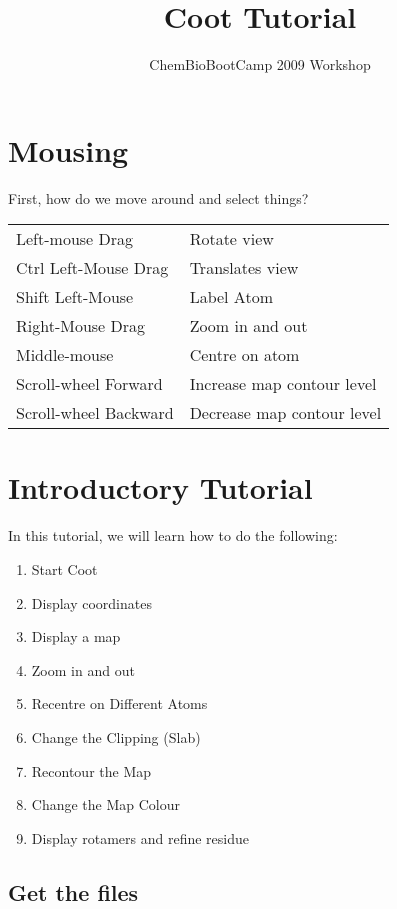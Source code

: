 \documentclass{article}
\title{Coot Tutorial}
\author{ChemBioBootCamp 2009 Workshop}
\begin{document}
\maketitle
\tableofcontents


\newpage

\section{Mousing}

First, how do we move around and select things?

\vspace{0.5cm}
  \begin{tabular}{ll}
    Left-mouse Drag & Rotate view \\
    Ctrl Left-Mouse Drag &  Translates view \\
    Shift Left-Mouse &  Label Atom\\
    Right-Mouse Drag &  Zoom in and out\index{zoom}\\
    Middle-mouse & Centre on atom\\
    Scroll-wheel Forward &  Increase map contour level\\
    Scroll-wheel Backward &  Decrease map contour level
  \end{tabular}
\vspace{0.5cm}

\section{Introductory Tutorial}

In this tutorial, we will learn how to do the following:
\begin{enumerate}
\item Start Coot
\item Display coordinates
\item Display a map
\item Zoom in and out
\item Recentre on Different Atoms
\item Change the Clipping (Slab)
\item Recontour the Map
\item Change the Map Colour
\item Display rotamers and refine residue
\end{enumerate}

\subsection{Get the files}
\end{document}

